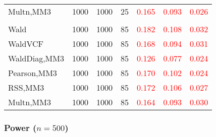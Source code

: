 \documentclass[
]{article}
\begin{document}
\begin{table}[H]
{\begin{tabular}[t]{lrrrrrr}
\hspace{1em}Multn,MM3 & 1000 & 1000 & 25 & \textcolor{red}{0.165} & \textcolor{red}{0.093} & \textcolor{red}{0.026}\\
\addlinespace[0.3em]
\multicolumn{7}{l}{\textbf{3F 15V}}\\
\hspace{1em}Wald & 1000 & 1000 & 85 & \textcolor{red}{0.182} & \textcolor{red}{0.108} & \textcolor{red}{0.032}\\
\hspace{1em}WaldVCF & 1000 & 1000 & 85 & \textcolor{red}{0.168} & \textcolor{red}{0.094} & \textcolor{red}{0.031}\\
\hspace{1em}WaldDiag,MM3 & 1000 & 1000 & 85 & \textcolor{red}{0.126} & \textcolor{red}{0.077} & \textcolor{red}{0.024}\\
\hspace{1em}Pearson,MM3 & 1000 & 1000 & 85 & \textcolor{red}{0.170} & \textcolor{red}{0.102} & \textcolor{red}{0.024}\\
\hspace{1em}RSS,MM3 & 1000 & 1000 & 85 & \textcolor{red}{0.172} & \textcolor{red}{0.106} & \textcolor{red}{0.027}\\
\hspace{1em}Multn,MM3 & 1000 & 1000 & 85 & \textcolor{red}{0.164} & \textcolor{red}{0.093} & \textcolor{red}{0.030}\\
\bottomrule
\end{tabular}}
\endgroup{}
\end{table}

\hypertarget{power-n500-3}{%
\subsubsection{\texorpdfstring{Power
(\(n=500\))}{Power (n=500)}}\label{power-n500-3}}
\end{document}
